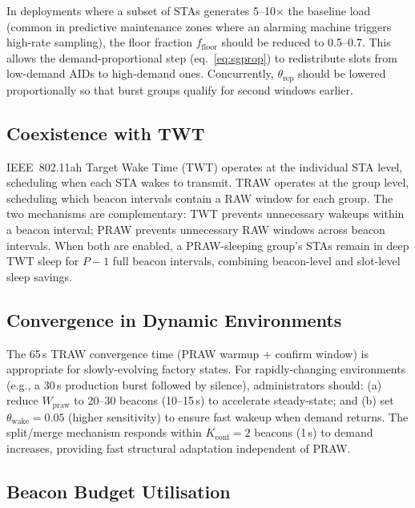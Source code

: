 \documentclass[journal]{IEEEtran}
\begin{document}
In deployments where a subset of STAs generates 5--10$\times$ the
baseline load (common in predictive maintenance zones where an
alarming machine triggers high-rate sampling), the floor fraction
$f_\mathrm{floor}$ should be reduced to 0.5--0.7.
This allows the demand-proportional step (eq.~\eqref{eq:sgprop}) to
redistribute slots from low-demand AIDs to high-demand ones.
Concurrently, $\theta_\mathrm{rep}$ should be lowered proportionally
so that burst groups qualify for second windows earlier.

\subsection{Coexistence with TWT}

IEEE~802.11ah Target Wake Time (TWT) operates at the individual STA
level, scheduling when each STA wakes to transmit.
TRAW operates at the group level, scheduling which beacon intervals
contain a RAW window for each group.
The two mechanisms are complementary: TWT prevents unnecessary wakeups
within a beacon interval; PRAW prevents unnecessary RAW windows across
beacon intervals.
When both are enabled, a PRAW-sleeping group's STAs remain in deep
TWT sleep for $P-1$ full beacon intervals, combining beacon-level and
slot-level sleep savings.

\subsection{Convergence in Dynamic Environments}

The 65\,s TRAW convergence time (PRAW warmup + confirm window) is
appropriate for slowly-evolving factory states.
For rapidly-changing environments (e.g., a 30\,s production burst
followed by silence), administrators should:
(a) reduce $W_\mathrm{praw}$ to 20--30 beacons (10--15\,s) to
    accelerate steady-state; and
(b) set $\theta_\mathrm{wake}\!=\!0.05$ (higher sensitivity) to
    ensure fast wakeup when demand returns.
The split/merge mechanism responds within $K_\mathrm{conf}\!=\!2$
beacons (1\,s) to demand increases, providing fast structural
adaptation independent of PRAW.

\subsection{Beacon Budget Utilisation}
\end{document}
